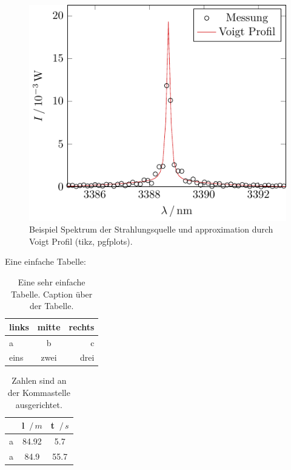 \begin{figure}%
  \centering
  \includegraphics{figures/voigtlaser.pdf}
  \caption{Beispiel Spektrum der Strahlungsquelle und approximation durch Voigt Profil (tikz, pgfplots).}
  \label{fig:VoigtProfil}
\end{figure}

Eine einfache Tabelle:
\begin{table}%
  \centering
  \caption{Eine sehr einfache Tabelle. Caption über der Tabelle.}
	\label{tab:simple}
	\begin{tabular}{lcr}
        \toprule
        links & mitte & rechts \\
        \midrule
        a & b & c \\
        eins & zwei & drei \\
		\bottomrule
	\end{tabular}
\end{table}

\begin{table}%
  \centering
  \caption{Zahlen sind an der Kommastelle ausgerichtet.}
	\label{tab:simple2}
	\begin{tabular}{l*2{S[table-format=3.2]}}
        \toprule
         & l $\, /\, \si{m}$ & t $\, /\, \si{s}$ \\
        \midrule
        a & 84.92 & 5.7 \\
        a & 84.9 & 55.7 \\
		\bottomrule
	\end{tabular}
\end{table}

